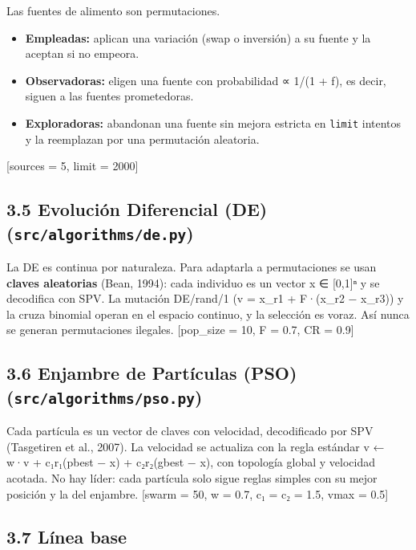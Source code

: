 \documentclass[
  spanish,
  11pt,
]{article}
\providecommand{\tightlist}{%
  \setlength{\itemsep}{0pt}\setlength{\parskip}{0pt}}
\begin{document}
Las fuentes de alimento son permutaciones.

\begin{itemize}
\tightlist
\item
  \textbf{Empleadas:} aplican una variación (swap o inversión) a su
  fuente y la aceptan si no empeora.
\item
  \textbf{Observadoras:} eligen una fuente con probabilidad ∝ 1/(1 + f),
  es decir, siguen a las fuentes prometedoras.
\item
  \textbf{Exploradoras:} abandonan una fuente sin mejora estricta en
  \texttt{limit} intentos y la reemplazan por una permutación aleatoria.
\end{itemize}

{[}sources = 5, limit = 2000{]}

\subsection{\texorpdfstring{3.5 Evolución Diferencial (DE)
(\texttt{src/algorithms/de.py})}{3.5 Evolución Diferencial (DE) (src/algorithms/de.py)}}\label{evoluciuxf3n-diferencial-de-srcalgorithmsde.py}

La DE es continua por naturaleza. Para adaptarla a permutaciones se usan
\textbf{claves aleatorias} (Bean, 1994): cada individuo es un vector x ∈
{[}0,1{]}ⁿ y se decodifica con SPV. La mutación DE/rand/1 (v = x\_r1 +
F·(x\_r2 − x\_r3)) y la cruza binomial operan en el espacio continuo, y
la selección es voraz. Así nunca se generan permutaciones ilegales.
{[}pop\_size = 10, F = 0.7, CR = 0.9{]}

\subsection{\texorpdfstring{3.6 Enjambre de Partículas (PSO)
(\texttt{src/algorithms/pso.py})}{3.6 Enjambre de Partículas (PSO) (src/algorithms/pso.py)}}\label{enjambre-de-partuxedculas-pso-srcalgorithmspso.py}

Cada partícula es un vector de claves con velocidad, decodificado por
SPV (Tasgetiren et al., 2007). La velocidad se actualiza con la regla
estándar v ← w·v + c₁r₁(pbest − x) + c₂r₂(gbest − x), con topología
global y velocidad acotada. No hay líder: cada partícula solo sigue
reglas simples con su mejor posición y la del enjambre. {[}swarm = 50, w
= 0.7, c₁ = c₂ = 1.5, vmax = 0.5{]}

\subsection{3.7 Línea base}\label{luxednea-base}
\end{document}
